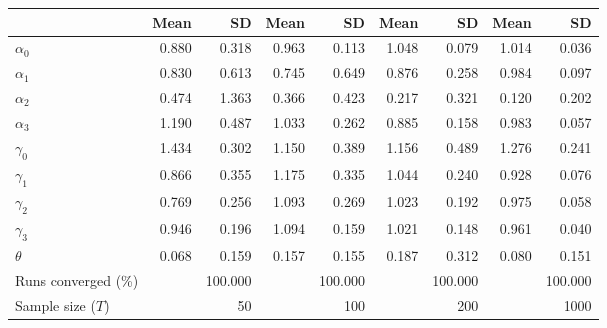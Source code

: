 
\begin{tabular}[t]{lrrrrrrrr}
\toprule
  & Mean & SD & Mean  & SD  & Mean   & SD   & Mean    & SD   \\
\midrule
$\alpha_{0}$ & 0.880 & 0.318 & 0.963 & 0.113 & 1.048 & 0.079 & 1.014 & 0.036\\
$\alpha_{1}$ & 0.830 & 0.613 & 0.745 & 0.649 & 0.876 & 0.258 & 0.984 & 0.097\\
$\alpha_{2}$ & 0.474 & 1.363 & 0.366 & 0.423 & 0.217 & 0.321 & 0.120 & 0.202\\
$\alpha_{3}$ & 1.190 & 0.487 & 1.033 & 0.262 & 0.885 & 0.158 & 0.983 & 0.057\\
$\gamma_{0}$ & 1.434 & 0.302 & 1.150 & 0.389 & 1.156 & 0.489 & 1.276 & 0.241\\
$\gamma_{1}$ & 0.866 & 0.355 & 1.175 & 0.335 & 1.044 & 0.240 & 0.928 & 0.076\\
$\gamma_{2}$ & 0.769 & 0.256 & 1.093 & 0.269 & 1.023 & 0.192 & 0.975 & 0.058\\
$\gamma_{3}$ & 0.946 & 0.196 & 1.094 & 0.159 & 1.021 & 0.148 & 0.961 & 0.040\\
$\theta$ & 0.068 & 0.159 & 0.157 & 0.155 & 0.187 & 0.312 & 0.080 & 0.151\\
Runs converged (\%) &  & 100.000 &  & 100.000 &  & 100.000 &  & 100.000\\
Sample size ($T$) &  & 50 &  & 100 &  & 200 &  & 1000\\
\bottomrule
\end{tabular}
